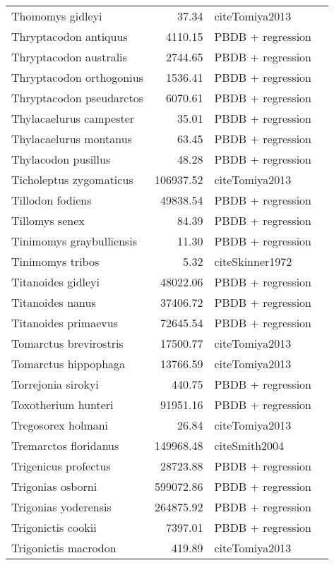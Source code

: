 \begin{table}[ht]
\begin{tabular}{lrll}
  Thomomys gidleyi & 37.34 & cite{Tomiya2013} &  \\ 
  Thryptacodon antiquus & 4110.15 & PBDB + regression &  \\ 
  Thryptacodon australis & 2744.65 & PBDB + regression &  \\ 
  Thryptacodon orthogonius & 1536.41 & PBDB + regression &  \\ 
  Thryptacodon pseudarctos & 6070.61 & PBDB + regression &  \\ 
  Thylacaelurus campester & 35.01 & PBDB + regression &  \\ 
  Thylacaelurus montanus & 63.45 & PBDB + regression &  \\ 
  Thylacodon pusillus & 48.28 & PBDB + regression &  \\ 
  Ticholeptus zygomaticus & 106937.52 & cite{Tomiya2013} &  \\ 
  Tillodon fodiens & 49838.54 & PBDB + regression &  \\ 
  Tillomys senex & 84.39 & PBDB + regression &  \\ 
  Tinimomys graybulliensis & 11.30 & PBDB + regression &  \\ 
  Tinimomys tribos & 5.32 & cite{Skinner1972} &  \\ 
  Titanoides gidleyi & 48022.06 & PBDB + regression &  \\ 
  Titanoides nanus & 37406.72 & PBDB + regression &  \\ 
  Titanoides primaevus & 72645.54 & PBDB + regression &  \\ 
  Tomarctus brevirostris & 17500.77 & cite{Tomiya2013} &  \\ 
  Tomarctus hippophaga & 13766.59 & cite{Tomiya2013} &  \\ 
  Torrejonia sirokyi & 440.75 & PBDB + regression &  \\ 
  Toxotherium hunteri & 91951.16 & PBDB + regression &  \\ 
  Tregosorex holmani & 26.84 & cite{Tomiya2013} &  \\ 
  Tremarctos floridanus & 149968.48 & cite{Smith2004} &  \\ 
  Trigenicus profectus & 28723.88 & PBDB + regression &  \\ 
  Trigonias osborni & 599072.86 & PBDB + regression &  \\ 
  Trigonias yoderensis & 264875.92 & PBDB + regression &  \\ 
  Trigonictis cookii & 7397.01 & PBDB + regression &  \\ 
  Trigonictis macrodon & 419.89 & cite{Tomiya2013} &  \\ 

\end{tabular}
\end{table}

